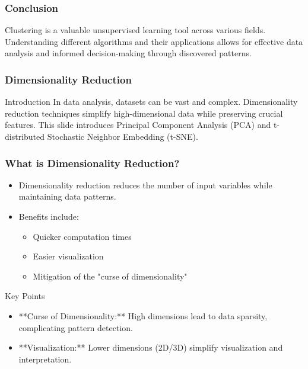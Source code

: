 \documentclass[aspectratio=169]{beamer}
\begin{document}
\begin{frame}[fragile]
    \frametitle{Conclusion}
    Clustering is a valuable unsupervised learning tool across various fields. Understanding different algorithms and their applications allows for effective data analysis and informed decision-making through discovered patterns.
\end{frame}

\begin{frame}[fragile]
    \frametitle{Dimensionality Reduction}
    \begin{block}{Introduction}
        In data analysis, datasets can be vast and complex. Dimensionality reduction techniques simplify high-dimensional data while preserving crucial features. This slide introduces Principal Component Analysis (PCA) and t-distributed Stochastic Neighbor Embedding (t-SNE).
    \end{block}
\end{frame}

\begin{frame}[fragile]
    \frametitle{What is Dimensionality Reduction?}
    \begin{itemize}
        \item Dimensionality reduction reduces the number of input variables while maintaining data patterns.
        \item Benefits include:
        \begin{itemize}
            \item Quicker computation times
            \item Easier visualization
            \item Mitigation of the "curse of dimensionality"
        \end{itemize}
    \end{itemize}
    
    \begin{block}{Key Points}
        \begin{itemize}
            \item **Curse of Dimensionality:** High dimensions lead to data sparsity, complicating pattern detection.
            \item **Visualization:** Lower dimensions (2D/3D) simplify visualization and interpretation.
        \end{itemize}
    \end{block}
\end{frame}
\end{document}
